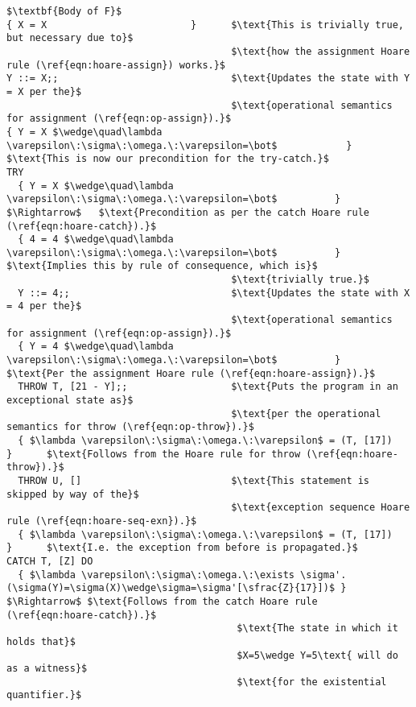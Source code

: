 \begin{lstlisting}[mathescape=true,keepspaces=true,label=lst:hoare_ex_asgn,caption=Decorated variant of the program from listing \ref{lst:imp-plus-ex}.]
$\textbf{Body of F}$
{ X = X                         }      $\text{This is trivially true, but necessary due to}$
                                       $\text{how the assignment Hoare rule (\ref{eqn:hoare-assign}) works.}$
Y ::= X;;                              $\text{Updates the state with Y = X per the}$
                                       $\text{operational semantics for assignment (\ref{eqn:op-assign}).}$
{ Y = X $\wedge\quad\lambda \varepsilon\:\sigma\:\omega.\:\varepsilon=\bot$            }      $\text{This is now our precondition for the try-catch.}$
TRY
  { Y = X $\wedge\quad\lambda \varepsilon\:\sigma\:\omega.\:\varepsilon=\bot$          } $\Rightarrow$   $\text{Precondition as per the catch Hoare rule (\ref{eqn:hoare-catch}).}$
  { 4 = 4 $\wedge\quad\lambda \varepsilon\:\sigma\:\omega.\:\varepsilon=\bot$          }      $\text{Implies this by rule of consequence, which is}$
                                       $\text{trivially true.}$
  Y ::= 4;;                            $\text{Updates the state with X = 4 per the}$
                                       $\text{operational semantics for assignment (\ref{eqn:op-assign}).}$
  { Y = 4 $\wedge\quad\lambda \varepsilon\:\sigma\:\omega.\:\varepsilon=\bot$          }      $\text{Per the assignment Hoare rule (\ref{eqn:hoare-assign}).}$
  THROW T, [21 - Y];;                  $\text{Puts the program in an exceptional state as}$
                                       $\text{per the operational semantics for throw (\ref{eqn:op-throw}).}$
  { $\lambda \varepsilon\:\sigma\:\omega.\:\varepsilon$ = (T, [17])          }      $\text{Follows from the Hoare rule for throw (\ref{eqn:hoare-throw}).}$
  THROW U, []                          $\text{This statement is skipped by way of the}$
                                       $\text{exception sequence Hoare rule (\ref{eqn:hoare-seq-exn}).}$
  { $\lambda \varepsilon\:\sigma\:\omega.\:\varepsilon$ = (T, [17])          }      $\text{I.e. the exception from before is propagated.}$
CATCH T, [Z] DO
  { $\lambda \varepsilon\:\sigma\:\omega.\:\exists \sigma'.(\sigma(Y)=\sigma(X)\wedge\sigma=\sigma'[\sfrac{Z}{17}])$ } $\Rightarrow$ $\text{Follows from the catch Hoare rule (\ref{eqn:hoare-catch}).}$
                                        $\text{The state in which it holds that}$
                                        $X=5\wedge Y=5\text{ will do as a witness}$
                                        $\text{for the existential quantifier.}$

\end{lstlisting}
